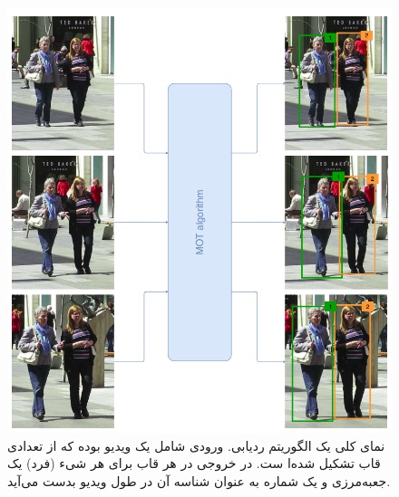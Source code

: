 \begin{figure}[htbp]
	\centering
	\includegraphics[scale=0.6]{figures/1_MOT_Diagram.png}
	\captionsetup{justification=centering}
	\caption[نمای کلی یک الگوریتم ردیابی]{نمای کلی یک الگوریتم ردیابی. ورودی شامل یک ویدیو بوده که از تعدادی قاب تشکیل شده‌ا	ست.  در خروجی در هر قاب برای هر شیء (فرد) یک جعبه‌مرزی  و یک شماره به عنوان شناسه آن در طول ویدیو بدست می‌آید\cite{ciaparrone2020deep}.}
	\label{1_MOT_Diagram}
\end{figure}